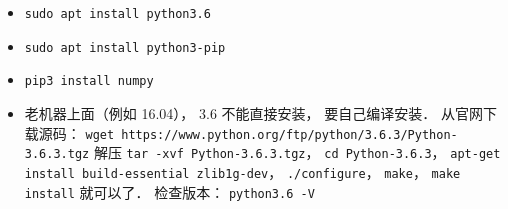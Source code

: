 

\begin{itemize}
\item \verb|sudo apt install python3.6|
\item \verb|sudo apt install python3-pip|
\item \verb|pip3 install numpy|
\item 老机器上面（例如 16.04）， 3.6 不能直接安装， 要自己编译安装． 从官网下载源码： \verb|wget https://www.python.org/ftp/python/3.6.3/Python-3.6.3.tgz| 解压 \verb|tar -xvf Python-3.6.3.tgz|， \verb|cd Python-3.6.3|， \verb|apt-get install build-essential zlib1g-dev|， \verb|./configure|， \verb|make|， \verb|make install| 就可以了． 检查版本： \verb|python3.6 -V|
\end{itemize}
